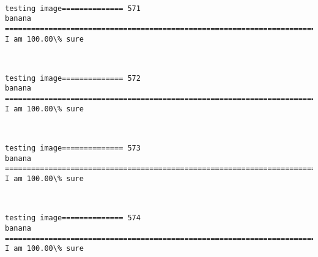 \documentclass[11pt]{article}
\begin{document}
    \begin{center}
    \end{center}
    { \hspace*{\fill} \\}
    
    \begin{Verbatim}[commandchars=\\\{\}]
testing image============== 571
banana
============================================================================
I am 100.00\% sure

    \end{Verbatim}

    \begin{center}
    \end{center}
    { \hspace*{\fill} \\}
    
    \begin{Verbatim}[commandchars=\\\{\}]
testing image============== 572
banana
============================================================================
I am 100.00\% sure

    \end{Verbatim}

    \begin{center}
    \end{center}
    { \hspace*{\fill} \\}
    
    \begin{Verbatim}[commandchars=\\\{\}]
testing image============== 573
banana
============================================================================
I am 100.00\% sure

    \end{Verbatim}

    \begin{center}
    \end{center}
    { \hspace*{\fill} \\}
    
    \begin{Verbatim}[commandchars=\\\{\}]
testing image============== 574
banana
============================================================================
I am 100.00\% sure

    \end{Verbatim}
\end{document}
